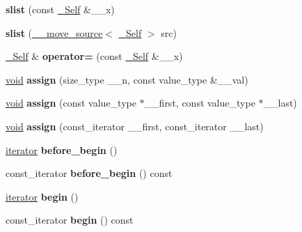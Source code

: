 \begin{DoxyCompactItemize}
\mbox{\label{classslist_af378f800b391d2018df9473f131c8678}} 
{\bfseries slist} (const \hyperlink{classslist}{\+\_\+\+Self} \&\+\_\+\+\_\+x)
\item 
\mbox{\label{classslist_a77d6e9d0cd663c719756dd399adb6f1a}} 
{\bfseries slist} (\hyperlink{class____move__source}{\+\_\+\+\_\+move\+\_\+source}$<$ \hyperlink{classslist}{\+\_\+\+Self} $>$ src)
\item 
\mbox{\label{classslist_a4f463b453fbe85059c79dbe394f19e0c}} 
\hyperlink{classslist}{\+\_\+\+Self} \& {\bfseries operator=} (const \hyperlink{classslist}{\+\_\+\+Self} \&\+\_\+\+\_\+x)
\item 
\mbox{\label{classslist_a6a5fa01695fcda5c227217e5e7844022}} 
\hyperlink{interfacevoid}{void} {\bfseries assign} (size\+\_\+type \+\_\+\+\_\+n, const value\+\_\+type \&\+\_\+\+\_\+val)
\item 
\mbox{\label{classslist_a520718d96a39c772e29b27bc9ae7709e}} 
\hyperlink{interfacevoid}{void} {\bfseries assign} (const value\+\_\+type $\ast$\+\_\+\+\_\+first, const value\+\_\+type $\ast$\+\_\+\+\_\+last)
\item 
\mbox{\label{classslist_aa2d9bf7cc0cb5d03de338e88b4e0e0e1}} 
\hyperlink{interfacevoid}{void} {\bfseries assign} (const\+\_\+iterator \+\_\+\+\_\+first, const\+\_\+iterator \+\_\+\+\_\+last)
\item 
\mbox{\label{classslist_a86d9b1c038344d26088832ea596334eb}} 
\hyperlink{structiterator}{iterator} {\bfseries before\+\_\+begin} ()
\item 
\mbox{\label{classslist_a9eaf3d9bcf4e8d8597b7e1affd3539a6}} 
const\+\_\+iterator {\bfseries before\+\_\+begin} () const
\item 
\mbox{\label{classslist_addbe19c1fcf1da5e4d568e6c540dd389}} 
\hyperlink{structiterator}{iterator} {\bfseries begin} ()
\item 
\mbox{\label{classslist_aa4bd0497b4c144f95e9390c91d900af2}} 
const\+\_\+iterator {\bfseries begin} () const
\item 

\end{DoxyCompactItemize}
